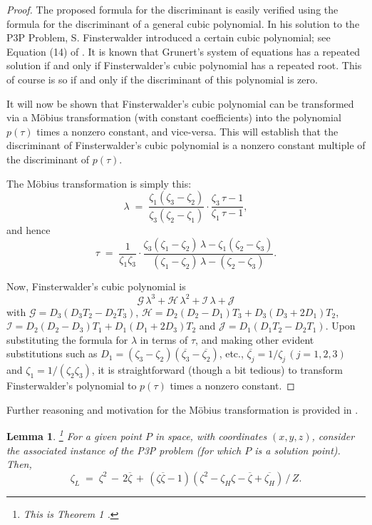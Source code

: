 \documentclass[a4paper, twoside]{article}
\newtheorem{lemma}{Lemma}
\begin{document}
\begin{proof}
The proposed formula for the discriminant is easily verified using the formula for the discriminant of a general cubic polynomial. In his solution to the P3P Problem, S. Finsterwalder introduced a certain cubic polynomial; see Equation (14) of \cite{HLON}. It is known that Grunert's system of equations has a repeated solution if and only if Finsterwalder's cubic polynomial has a repeated root. This of course is so if and only if the discriminant of this polynomial is zero. 

It will now be shown that Finsterwalder's cubic polynomial can be transformed via a M\"obius transformation (with constant coefficients) into the polynomial $p(\tau)$ times a nonzero constant, and vice-versa. This will establish that the discriminant of Finsterwalder's cubic polynomial is a nonzero constant multiple of the discriminant of $p(\tau)$. 

The M\"obius transformation is simply this:
$$\lambda \; = \; \frac{\zeta_1 (\zeta_3-\zeta_2)}{\zeta_3 (\zeta_2-\zeta_1)} \cdot \frac{\zeta_3 \, \tau - 1}{\zeta_1 \, \tau - 1} ,$$ 
and hence 
$$\tau \; = \; \frac{1}{\zeta_1 \zeta_3} \cdot \frac{\zeta_3 (\zeta_1-\zeta_2) \, \lambda - \zeta_1 (\zeta_2-\zeta_3)}{ (\zeta_1-\zeta_2) \, \lambda - (\zeta_2-\zeta_3)} .$$ 

Now, Finsterwalder's cubic polynomial is 
$$\mathcal{G} \, \lambda^3 + \mathcal{H} \, \lambda^2 + \mathcal{I} \, \lambda + \mathcal{J}$$
with $\mathcal{G} = D_3 (D_3 T_2 - D_2 T_3)$, $\mathcal{H} = D_2 (D_2-D_1) T_3 + D_3(D_3+2 D_1) T_2$, $\mathcal{I} = D_2 (D_2-D_3) T_1 + D_1(D_1+2 D_3) T_2$ and $\mathcal{J} = D_1 (D_1 T_2 - D_2 T_1)$. Upon substituting the formula for $\lambda$ in terms of $\tau$, and making other evident substitutions such as $D_1 = (\zeta_3-\zeta_2) (\overline{\zeta_3}-\overline{\zeta_2})$, etc., $\overline{\zeta_j} = 1 / \zeta_j \, (j = 1,2,3)$ and $\zeta_1 = 1 / (\zeta_2 \zeta_3)$, it is straightforward (though a bit tedious) to transform Finsterwalder's polynomial to $p(\tau)$ times a nonzero constant. 
\end{proof}

\noindent Further reasoning and motivation for the M\"obius transformation is provided in \cite{R3}. 

\vspace{2mm}

\begin{lemma}\footnote{This is Theorem 1 \cite{RW}.} 
For a given point $P$ in space, with coordinates $(x,y,z)$, consider the associated instance of the P3P problem (for which $P$ is a solution point). Then, 
$$\zeta_L \; = \; \zeta^2 \, - \, 2 \overline{\zeta} \, + \, ( \zeta \overline{\zeta} - 1 ) ( \zeta^2 - \zeta_H \zeta - \overline{\zeta} + \overline{\zeta_H}) \, / \, Z.$$
\end{lemma}
\end{document}
